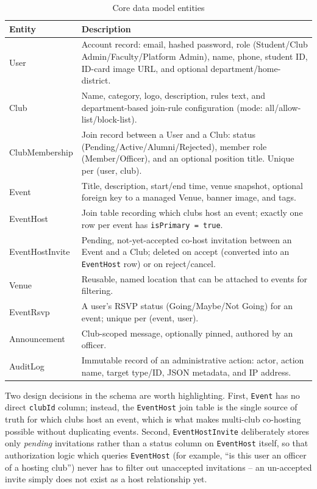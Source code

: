 \documentclass[12pt,oneside]{book}
\begin{document}
\begin{table}[H]
\caption{Core data model entities}
\label{tab:4.3}
\centering
\small
\begin{tabularx}{\textwidth}{@{}p{2.6cm}X@{}}
\toprule
Entity & Description \\
\midrule
User & Account record: email, hashed password, role (Student/Club Admin/Faculty/Platform Admin), name, phone, student ID, ID-card image URL, and optional department/home-district. \\
Club & Name, category, logo, description, rules text, and department-based join-rule configuration (mode: all/allow-list/block-list). \\
ClubMembership & Join record between a User and a Club: status (Pending/Active/Alumni/Rejected), member role (Member/Officer), and an optional position title. Unique per (user, club). \\
Event & Title, description, start/end time, venue snapshot, optional foreign key to a managed Venue, banner image, and tags. \\
EventHost & Join table recording which clubs host an event; exactly one row per event has \texttt{isPrimary = true}. \\
EventHostInvite & Pending, not-yet-accepted co-host invitation between an Event and a Club; deleted on accept (converted into an \texttt{EventHost} row) or on reject/cancel. \\
Venue & Reusable, named location that can be attached to events for filtering. \\
EventRsvp & A user's RSVP status (Going/Maybe/Not Going) for an event; unique per (event, user). \\
Announcement & Club-scoped message, optionally pinned, authored by an officer. \\
AuditLog & Immutable record of an administrative action: actor, action name, target type/ID, JSON metadata, and IP address. \\
\bottomrule
\end{tabularx}
\end{table}

Two design decisions in the schema are worth highlighting. First, \texttt{Event} has no direct \texttt{clubId} column; instead, the \texttt{EventHost} join table is the single source of truth for which clubs host an event, which is what makes multi-club co-hosting possible without duplicating events. Second, \texttt{EventHostInvite} deliberately stores only \emph{pending} invitations rather than a status column on \texttt{EventHost} itself, so that authorization logic which queries \texttt{EventHost} (for example, ``is this user an officer of a hosting club'') never has to filter out unaccepted invitations -- an un-accepted invite simply does not exist as a host relationship yet.
\end{document}
